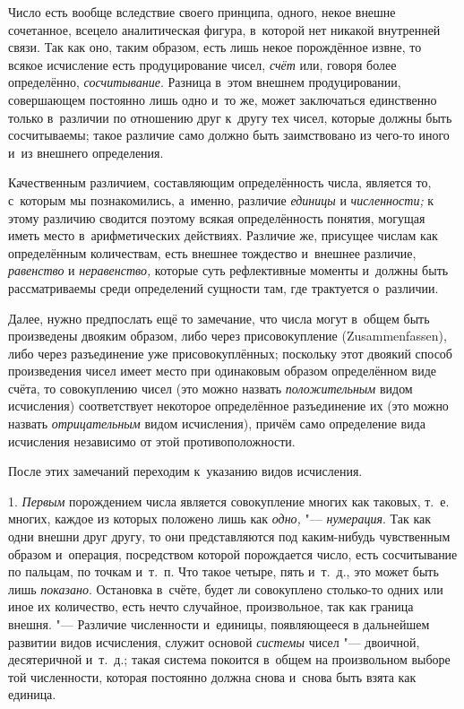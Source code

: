 Число есть вообще вследствие своего принципа, одного, некое внешне сочетанное,
всецело аналитическая фигура, в~которой нет никакой внутренней связи. Так как
оно, таким образом, есть лишь некое порождённое извне, то всякое исчисление
есть продуцирование чисел, {\em счёт} или, говоря более определённо,
{\em сосчитывание}. Разница в~этом внешнем продуцировании, совершающем
постоянно лишь одно и~то же, может заключаться единственно только в~различии по
отношению друг к~другу тех чисел, которые должны быть сосчитываемы; такое
различие само должно быть заимствовано из чего-то иного и~из внешнего
определения.

Качественным различием, составляющим определённость числа, является то,
с~которым мы познакомились, а~именно, различие {\em единицы} и {\em численности;}
к этому различию сводится поэтому всякая определённость понятия, могущая иметь
место в~арифметических действиях. Различие же, присущее числам как определённым
количествам, есть внешнее тождество и~внешнее различие, {\em равенство} и
{\em неравенство,} которые суть рефлективные моменты и~должны быть
рассматриваемы среди определений сущности там, где трактуется о~различии.

Далее, нужно предпослать ещё то замечание, что числа могут в~общем быть
произведены двояким образом, либо через присовокупление
(Zu\-sam\-men\-fas\-sen), либо через разъединение уже присовокуплённых;
поскольку этот двоякий способ произведения чисел имеет место при одинаковым
образом определённом виде счёта, то совокуплению чисел (это можно назвать
{\em положительным} видом исчисления) соответствует некоторое определённое
разъединение их (это можно назвать {\em отрицательным} видом исчисления),
причём само определение вида исчисления независимо от этой противоположности.

После этих замечаний переходим к~указанию видов исчисления.

1. {\em Первым} порождением числа является совокупление многих как таковых, т.~е.
многих, каждое из которых положено лишь как {\em одно,} "--- {\em нумерация}.
Так как одни внешни друг другу, то они представляются под каким-нибудь
чувственным образом и~операция, посредством которой порождается число, есть
сосчитывание по пальцам, по точкам и~т.~п. Что такое четыре, пять и~т.~д., это
может быть лишь {\em показано}. Остановка в~счёте, будет ли совокуплено
столько-то одних или иное их количество, есть нечто случайное, произвольное,
так как граница внешня. "--- Различие численности и~единицы, появляющееся в
дальнейшем развитии видов исчисления, служит основой {\em системы} чисел "---
двоичной, десятеричной и~т.~д.; такая система покоится в~общем на произвольном
выборе той численности, которая постоянно должна снова и~снова быть взята как
единица.


